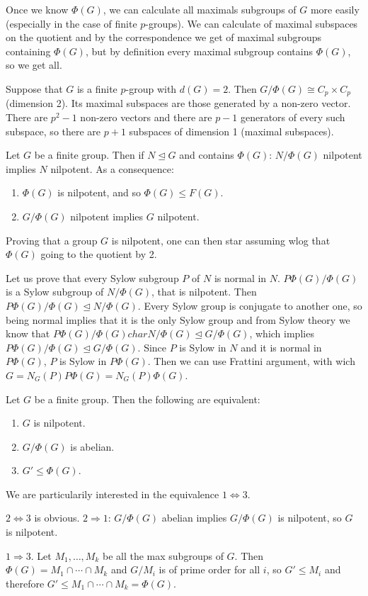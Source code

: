 \documentclass[twoside, 11pt]{article}
\begin{document}
 Once we know $\Phi(G)$, we can calculate all maximals subgroups of $G$ more easily (especially in the case of finite $p$-groups). We can calculate of maximal subspaces on the quotient and by the correspondence we get of maximal subgroups containing $\Phi(G)$, but by definition every maximal subgroup contains $\Phi(G)$, so we get all.
 

\begin{ej}
Suppose that $G$ is a finite $p$-group with $d(G)=2$. Then $G/\Phi(G)\cong C_p\times C_p$ (dimension 2). Its maximal subspaces are those generated by a non-zero vector. There are $p^2-1$ non-zero vectors and there are $p-1$ generators of every such subspace, so there are $p+1$ subspaces of dimension 1 (maximal subspaces). 
\end{ej}

\begin{teorema}
Let $G$ be a finite group. Then if $N\trianglelefteq G$ and contains $\Phi(G)$: $N/\Phi(G)$ nilpotent implies $N$ nilpotent. As a consequence:
\begin{enumerate}
\item $\Phi(G)$ is nilpotent, and so $\Phi(G)\leq F(G)$.
\item $G/\Phi(G)$ nilpotent implies $G$ nilpotent. 
\end{enumerate}
\end{teorema}
Proving that a group $G$ is nilpotent, one can then star assuming wlog that $\Phi(G)$ going to the quotient by 2. 

\begin{dem}
Let us prove that every Sylow subgroup $P$ of $N$ is normal in $N$. $P\Phi(G)/\Phi(G)$ is a Sylow subgroup of $N/\Phi(G)$, that is nilpotent. Then $P\Phi(G)/\Phi(G)\trianglelefteq N/\Phi(G)$. Every Sylow group is conjugate to another one, so being normal implies that it is the only Sylow group and from Sylow theory we know that $P\Phi(G)/\Phi(G) char N/\Phi(G)\trianglelefteq G/\Phi(G)$, which implies $P\Phi(G)/\Phi(G)\trianglelefteq G/\Phi(G)$. Since $P$ is Sylow in $N$ and it is normal in $P\Phi(G)$, $P$ is Sylow in $P\Phi(G)$. Then we can use Frattini argument, with wich $G=N_G(P)P\Phi(G)=N_G(P)\Phi(G)$. 
\end{dem}


\begin{coro}
Let $G$ be a finite group. Then the following are equivalent:
\begin{enumerate}
\item $G$ is nilpotent.
\item $G/\Phi(G)$ is abelian.
\item $G'\leq \Phi(G)$.
\end{enumerate}
\end{coro}
We are particularily interested in the equivalence $1\Leftrightarrow 3$. 
\begin{dem}
$2\Leftrightarrow 3$ is obvious. $2\Rightarrow 1$: $G/\Phi(G)$ abelian implies $G/\Phi(G)$ is nilpotent, so $G$ is nilpotent.

$1\Rightarrow 3$. Let $M_1,\dots, M_k$ be all the max subgroups of $G$. Then $\Phi(G)=M_1\cap\cdots\cap M_k$ and $G/M_i$ is of prime order for all $i$, so $G'\leq M_i$ and therefore $G'\leq M_1\cap\cdots\cap M_k=\Phi(G)$. 
\end{dem}
\end{document}
